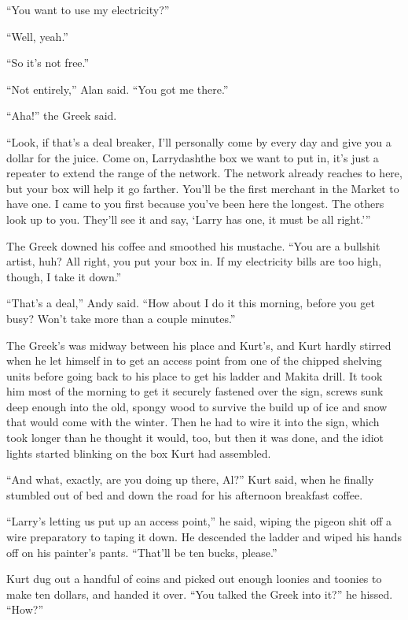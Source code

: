 ``You want to use my electricity?''

``Well, yeah.''

``So it's not free.''

``Not entirely,'' Alan said.  ``You got me there.''

``Aha!'' the Greek said.

``Look, if that's a deal breaker, I'll personally come by every day
and give you a dollar for the juice.  Come on, Larrydash{}the box we want
to put in, it's just a repeater to extend the range of the network. 
The network already reaches to here, but your box will help it go
farther.  You'll be the first merchant in the Market to have one.  I
came to you first because you've been here the longest.  The others
look up to you.  They'll see it and say, `Larry has one, it must be
all right.'''

The Greek downed his coffee and smoothed his mustache.  ``You are a
bullshit artist, huh?  All right, you put your box in.  If my
electricity bills are too high, though, I take it down.''

``That's a deal,'' Andy said.  ``How about I do it this morning,
before you get busy?  Won't take more than a couple minutes.''

The Greek's was midway between his place and Kurt's, and Kurt hardly
stirred when he let himself in to get an access point from one of the
chipped shelving units before going back to his place to get his
ladder and Makita drill.  It took him most of the morning to get it
securely fastened over the sign, screws sunk deep enough into the old,
spongy wood to survive the build up of ice and snow that would come
with the winter.  Then he had to wire it into the sign, which took
longer than he thought it would, too, but then it was done, and the
idiot lights started blinking on the box Kurt had assembled.

``And what, exactly, are you doing up there, Al?'' Kurt said, when he
finally stumbled out of bed and down the road for his afternoon
breakfast coffee.

``Larry's letting us put up an access point,'' he said, wiping the
pigeon shit off a wire preparatory to taping it down.  He descended
the ladder and wiped his hands off on his painter's pants.  ``That'll
be ten bucks, please.''

Kurt dug out a handful of coins and picked out enough loonies and
toonies to make ten dollars, and handed it over.  ``You talked the
Greek into it?'' he hissed.  ``How?''

